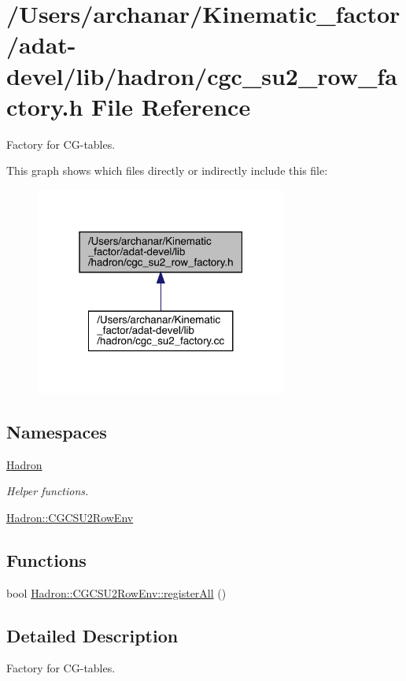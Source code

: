 \hypertarget{adat-devel_2lib_2hadron_2cgc__su2__row__factory_8h}{}\section{/\+Users/archanar/\+Kinematic\+\_\+factor/adat-\/devel/lib/hadron/cgc\+\_\+su2\+\_\+row\+\_\+factory.h File Reference}
\label{adat-devel_2lib_2hadron_2cgc__su2__row__factory_8h}


Factory for C\+G-\/tables.  


This graph shows which files directly or indirectly include this file\+:
\nopagebreak
\begin{figure}[H]
\begin{center}
\leavevmode
\includegraphics[width=235pt]{da/dbd/adat-devel_2lib_2hadron_2cgc__su2__row__factory_8h__dep__incl}
\end{center}
\end{figure}
\subsection*{Namespaces}
\begin{DoxyCompactItemize}
\item 
 \mbox{\hyperlink{namespaceHadron}{Hadron}}
\begin{DoxyCompactList}\small\item\em Helper functions. \end{DoxyCompactList}\item 
 \mbox{\hyperlink{namespaceHadron_1_1CGCSU2RowEnv}{Hadron\+::\+C\+G\+C\+S\+U2\+Row\+Env}}
\end{DoxyCompactItemize}
\subsection*{Functions}
\begin{DoxyCompactItemize}
\item 
bool \mbox{\hyperlink{namespaceHadron_1_1CGCSU2RowEnv_a613b8fd4057061e97fd9c03d53dfc4e8}{Hadron\+::\+C\+G\+C\+S\+U2\+Row\+Env\+::register\+All}} ()
\end{DoxyCompactItemize}


\subsection{Detailed Description}
Factory for C\+G-\/tables. 

